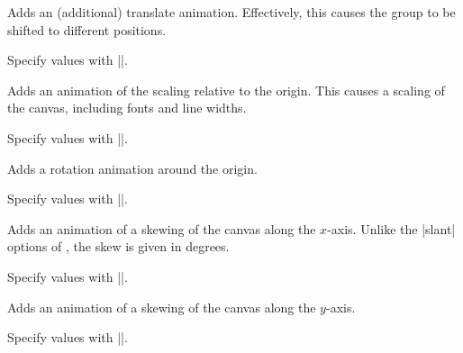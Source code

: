 \begin{command}{\pgfsys@animatetranslate}
  Adds an (additional) translate animation. Effectively, this causes
  the group to be shifted to different positions.
  
  Specify values with |\pgfsys@animation@translate|. 
\begin{codeexample}[width=2cm]
\end{codeexample}
\end{command}

\begin{command}{\pgfsys@animatescale}
  Adds an animation of the scaling relative to the origin. This causes
  a scaling of the canvas, including fonts and line widths.
  
  Specify values with |\pgfsys@animation@scale|.
\begin{codeexample}[width=2cm]
\end{codeexample}
\end{command}

\begin{command}{\pgfsys@animaterotate}
  Adds a rotation animation around the origin.
  
  Specify values with |\pgfsys@animation@scalar|.
\begin{codeexample}[width=2cm]
\end{codeexample}
\end{command}

\begin{command}{\pgfsys@animateskewx}
  Adds an animation of a skewing of the canvas along the
  $x$-axis. Unlike the |slant| options of \tikzname, the skew is given
  in degrees.
  
  Specify values with |\pgfsys@animation@scalar|.
\begin{codeexample}[width=2cm]
\end{codeexample}
\end{command}

\begin{command}{\pgfsys@animateskewy}
  Adds an animation of a skewing of the canvas along the $y$-axis.
  
  Specify values with |\pgfsys@animation@scalar|.
\end{command}

